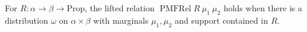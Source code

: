 \begin{definition}
  \label{def:coupling}
  \leanok
  For $R : \alpha \to \beta \to \mathrm{Prop}$, the lifted relation $\operatorname{PMFRel} R\ \mu_1\ \mu_2$ holds when there is a distribution $\omega$ on $\alpha \times \beta$ with marginals $\mu_1, \mu_2$ and support contained in $R$.
\end{definition}
